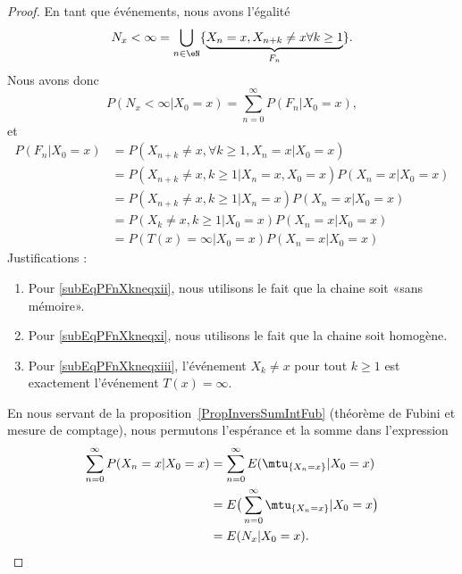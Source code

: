 \begin{proof}
	En tant que événements, nous avons l'égalité
	\begin{equation}
		N_x<\infty=\bigcup_{n\in\eN}\{\underbrace{ X_n=x,X_{n+k}\neq x\forall k\geq 1}_{F_n} \}.
	\end{equation}
	Nous avons donc
	\begin{equation}    \label{Eqreprencalculstd}
		P(N_x<\infty|X_0=x)=\sum_{n=0}^{\infty}P(F_n|X_0=x),
	\end{equation}
	et
	\begin{subequations}
		\begin{align}
			P(F_n|X_0=x) & =P(X_{n+k}\neq x, \forall k\geq 1,X_n=x|X_0=x)                          \\
			             & =P(X_{n+k}\neq x,k\geq 1|X_n=x,X_0=x)P(X_n=x|X_0=x)                     \\
			             & =P(X_{n+k}\neq x,k\geq 1|X_n=x)P(X_n=x|X_0=x)  \label{subEqPFnXkneqxii} \\
			             & =P(X_k\neq x,k\geq 1|X_0=x)P(X_n=x|X_0=x)  \label{subEqPFnXkneqxi}      \\
			             & =P(T(x)=\infty|X_0=x)P(X_n=x|X_0=x)    \label{subEqPFnXkneqxiii}
		\end{align}
	\end{subequations}
	Justifications :
	\begin{enumerate}
		\item
		      Pour \eqref{subEqPFnXkneqxii}, nous utilisons le fait que la chaine soit «sans mémoire».
		\item
		      Pour \eqref{subEqPFnXkneqxi}, nous utilisons le fait que la chaine soit homogène.
		\item
		      Pour \eqref{subEqPFnXkneqxiii}, l'événement \( X_k\neq x\) pour tout \( k\geq 1\) est exactement l'événement \( T(x)=\infty\).
	\end{enumerate}
	En nous servant de la proposition~\ref{PropInversSumIntFub} (théorème de Fubini et mesure de comptage), nous permutons l'espérance et la somme dans l'expression
	\begin{subequations}        \label{EqPEEEntstq}
		\begin{align}
			\sum_{n=0}^{\infty}P(X_n=x|X_0=x) & =\sum_{n=0}^{\infty}E(\mtu_{\{ X_n=x \}}|X_0=x)           \\
			                                  & =E\big( \sum_{n=0}^{\infty}\mtu_{\{ X_n=x \}}|X_0=x \big) \\
			                                  & =E(N_x|X_0=x).

\end{align}
\end{subequations}
\end{proof}
